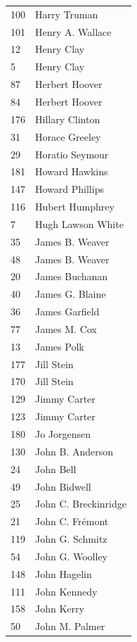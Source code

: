 \documentclass[
  letterpaper,
  DIV=11,
  numbers=noendperiod]{scrreprt}
\begin{document}
\begin{tabular}{ll}
100 &            Harry Truman \\
101 &        Henry A. Wallace \\
12  &              Henry Clay \\
5   &              Henry Clay \\
87  &          Herbert Hoover \\
84  &          Herbert Hoover \\
176 &         Hillary Clinton \\
31  &          Horace Greeley \\
29  &         Horatio Seymour \\
181 &          Howard Hawkins \\
147 &         Howard Phillips \\
116 &         Hubert Humphrey \\
7   &       Hugh Lawson White \\
35  &         James B. Weaver \\
48  &         James B. Weaver \\
20  &          James Buchanan \\
40  &         James G. Blaine \\
36  &          James Garfield \\
77  &            James M. Cox \\
13  &              James Polk \\
177 &              Jill Stein \\
170 &              Jill Stein \\
129 &            Jimmy Carter \\
123 &            Jimmy Carter \\
180 &            Jo Jorgensen \\
130 &        John B. Anderson \\
24  &               John Bell \\
49  &            John Bidwell \\
25  &    John C. Breckinridge \\
21  &         John C. Frémont \\
119 &         John G. Schmitz \\
54  &         John G. Woolley \\
148 &            John Hagelin \\
111 &            John Kennedy \\
158 &              John Kerry \\
50  &          John M. Palmer \\

\end{tabular}
\end{document}
